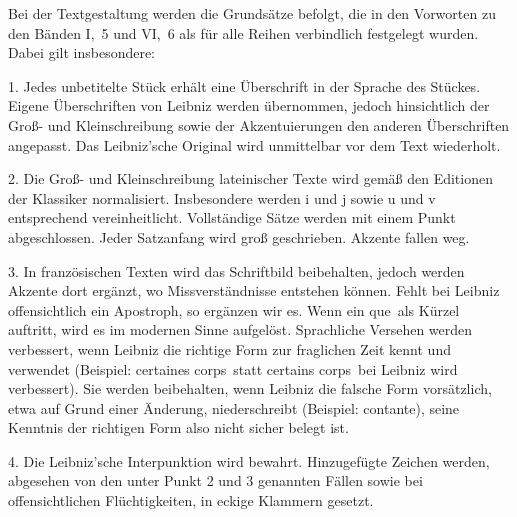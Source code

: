 
\noindent Bei der Textgestaltung werden die Grundsätze befolgt, die in den Vorworten zu den Bänden I,~5 und VI,~6 als für alle Reihen verbindlich festgelegt wurden. Dabei gilt insbesondere:
\par
1. Jedes unbetitelte Stück erhält eine Überschrift in der Sprache des Stückes. Eigene Überschriften von Leibniz werden übernommen, jedoch hinsichtlich der Groß- und Kleinschreibung sowie der Akzentuierungen den anderen Überschriften angepasst. Das Leibniz'sche Original wird unmittelbar vor dem Text wiederholt.
\par
2. Die Groß- und Kleinschreibung lateinischer Texte wird gemäß den Editionen der Klassiker normalisiert. Insbesondere werden i und j sowie u und v entsprechend vereinheitlicht. Vollständige Sätze werden mit einem Punkt abgeschlossen. Jeder Satzanfang wird groß geschrieben. Akzente fallen weg.
\par
3. In französischen Texten wird das Schriftbild beibehalten, jedoch werden Akzente dort ergänzt, wo Missverständnisse entstehen können. Fehlt bei Leibniz offensichtlich ein Apostroph, so ergänzen wir es. Wenn ein \glqq que\grqq\ als Kürzel auftritt, wird es im modernen Sinne aufgelöst. Sprachliche Versehen werden verbessert, wenn Leibniz die richtige Form zur fraglichen Zeit kennt und verwendet (Beispiel: \glqq certaines corps\grqq\ statt \glqq certains corps\grqq\ bei Leibniz wird verbessert). Sie werden beibehalten, wenn Leibniz die falsche Form vorsätzlich, etwa auf Grund einer Änderung, niederschreibt (Beispiel: \glqq contante\grqq), seine Kenntnis der richtigen Form also nicht sicher belegt ist.
\par
4. Die Leibniz'sche Interpunktion wird bewahrt. Hinzugefügte Zeichen werden, abgesehen von den unter Punkt 2 und 3 genannten Fällen sowie bei offensichtlichen Flüchtigkeiten, in eckige Klammern gesetzt.
\par


